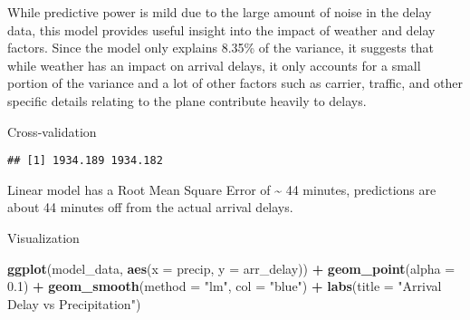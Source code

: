 \documentclass[
]{article}
\newenvironment{Shaded}{\begin{snugshade}}{\end{snugshade}}
\newcommand{\AttributeTok}[1]{\textcolor[rgb]{0.13,0.29,0.53}{#1}}
\newcommand{\DecValTok}[1]{\textcolor[rgb]{0.00,0.00,0.81}{#1}}
\newcommand{\FloatTok}[1]{\textcolor[rgb]{0.00,0.00,0.81}{#1}}
\newcommand{\FunctionTok}[1]{\textcolor[rgb]{0.13,0.29,0.53}{\textbf{#1}}}
\newcommand{\NormalTok}[1]{#1}
\newcommand{\OtherTok}[1]{\textcolor[rgb]{0.56,0.35,0.01}{#1}}
\newcommand{\SpecialCharTok}[1]{\textcolor[rgb]{0.81,0.36,0.00}{\textbf{#1}}}
\newcommand{\StringTok}[1]{\textcolor[rgb]{0.31,0.60,0.02}{#1}}
\begin{document}
While predictive power is mild due to the large amount of noise in the
delay data, this model provides useful insight into the impact of
weather and delay factors. Since the model only explains 8.35\% of the
variance, it suggests that while weather has an impact on arrival
delays, it only accounts for a small portion of the variance and a lot
of other factors such as carrier, traffic, and other specific details
relating to the plane contribute heavily to delays.

Cross-validation

\begin{Shaded}
\end{Shaded}

\begin{verbatim}
## [1] 1934.189 1934.182
\end{verbatim}

Linear model has a Root Mean Square Error of \textasciitilde{} 44
minutes, predictions are about 44 minutes off from the actual arrival
delays.

Visualization

\begin{Shaded}
\begin{Highlighting}[]
\FunctionTok{ggplot}\NormalTok{(model\_data, }\FunctionTok{aes}\NormalTok{(}\AttributeTok{x =}\NormalTok{ precip, }\AttributeTok{y =}\NormalTok{ arr\_delay)) }\SpecialCharTok{+}
  \FunctionTok{geom\_point}\NormalTok{(}\AttributeTok{alpha =} \FloatTok{0.1}\NormalTok{) }\SpecialCharTok{+}
  \FunctionTok{geom\_smooth}\NormalTok{(}\AttributeTok{method =} \StringTok{"lm"}\NormalTok{, }\AttributeTok{col =} \StringTok{"blue"}\NormalTok{) }\SpecialCharTok{+}
  \FunctionTok{labs}\NormalTok{(}\AttributeTok{title =} \StringTok{"Arrival Delay vs Precipitation"}\NormalTok{)}
\end{Highlighting}
\end{Shaded}
\end{document}
